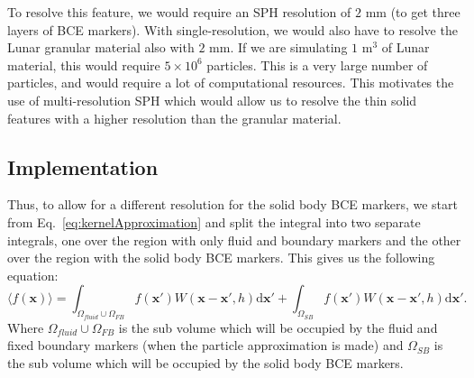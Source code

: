 \documentclass{article}
\newcommand{\vx}{\mathbf{x}}
\newcommand{\dd}{\mathrm{d}}
\begin{document}
To resolve this feature, we would require an SPH resolution of $2$ mm (to get three layers of BCE markers). With single-resolution, we would also have to resolve the Lunar granular material also with $2$ mm. If we are simulating $1$ m$^3$ of Lunar material, this would require $5 \times 10^6$ particles. This is a very large number of particles, and would require a lot of computational resources. This motivates the use of multi-resolution SPH which would allow us to resolve the thin solid features with a higher resolution than the granular material.
\subsection*{Implementation}
Thus, to allow for a different resolution for the solid body BCE markers, we start from Eq.~\ref{eq:kernelApproximation} and split the integral into two separate integrals, one over the region with only fluid and boundary markers and the other over the region with the solid body BCE markers. This gives us the following equation:
\begin{equation}
    \label{eq:multiResolutionSPH}
    \langle f(\vx) \rangle = \int_{\Omega_{fluid} \cup \Omega_{FB}} f(\vx') W(\vx - \vx', h) \dd{\vx'} + \int_{\Omega_{SB}} f(\vx') W(\vx - \vx', h) \dd{\vx'}.
\end{equation}
Where $\Omega_{fluid} \cup \Omega_{FB}$ is the sub volume which will be occupied by the fluid and fixed boundary markers (when the particle approximation is made) and $\Omega_{SB}$ is the sub volume which will be occupied by the solid body BCE markers.   
\end{document}
